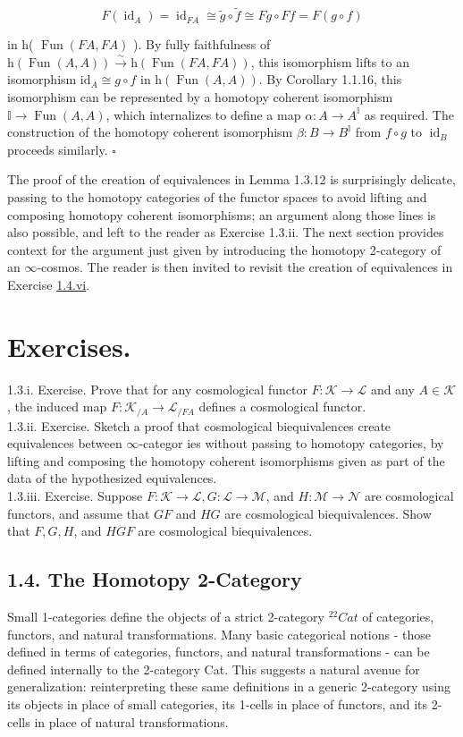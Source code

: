 \documentclass[10pt]{article}
\begin{document}
$$
F\left(\operatorname{id}_{A}\right)=\operatorname{id}_{F A} \cong \tilde{g} \circ \tilde{f} \cong F g \circ F f=F(g \circ f)
$$

in h( $\operatorname{Fun}(F A, F A)$ ). By fully faithfulness of $\mathrm{h}(\operatorname{Fun}(A, A)) \xrightarrow{\sim} \mathrm{h}(\operatorname{Fun}(F A, F A))$, this isomorphism lifts to an isomorphism $\mathrm{id}_{A} \cong g \circ f$ in $\mathrm{h}(\operatorname{Fun}(A, A))$. By Corollary 1.1.16, this isomorphism can be represented by a homotopy coherent isomorphism $\mathbb{I} \rightarrow \operatorname{Fun}(A, A)$, which internalizes to define a map $\alpha: A \rightarrow A^{\mathbb{I}}$ as required. The construction of the homotopy coherent isomorphism $\beta: B \rightarrow B^{\mathbb{I}}$ from $f \circ g$ to $\operatorname{id}_{B}$ proceeds similarly. \(\square\)

The proof of the creation of equivalences in Lemma 1.3.12 is surprisingly delicate, passing to the homotopy categories of the functor spaces to avoid lifting and composing homotopy coherent isomorphisms; an argument along those lines is also possible, and left to the reader as Exercise 1.3.ii. The next section provides context for the argument just given by introducing the homotopy 2-category of an $\infty$-cosmos. The reader is then invited to revisit the creation of equivalences in Exercise \href{http://1.4.vi}{1.4.vi}.

\section*{Exercises.}
1.3.i. Exercise. Prove that for any cosmological functor $F: \mathcal{K} \rightarrow \mathcal{L}$ and any $A \in \mathcal{K}$, the induced map $F: \mathcal{K}_{/ A} \rightarrow \mathcal{L}_{/ F A}$ defines a cosmological functor.\\
1.3.ii. Exercise. Sketch a proof that cosmological biequivalences create equivalences between $\infty$-categor ies without passing to homotopy categories, by lifting and composing the homotopy coherent isomorphisms given as part of the data of the hypothesized equivalences.\\
1.3.iii. Exercise. Suppose $F: \mathcal{K} \rightarrow \mathcal{L}, G: \mathcal{L} \rightarrow \mathcal{M}$, and $H: \mathcal{M} \rightarrow \mathcal{N}$ are cosmological functors, and assume that $G F$ and $H G$ are cosmological biequivalences. Show that $F, G, H$, and $H G F$ are cosmological biequivalences.

\subsection*{1.4. The Homotopy 2-Category}
Small 1-categories define the objects of a strict 2-category ${ }^{22} C a t$ of categories, functors, and natural transformations. Many basic categorical notions - those defined in terms of categories, functors, and natural transformations - can be defined internally to the 2-category Cat. This suggests a natural avenue for generalization: reinterpreting these same definitions in a generic 2-category using its objects in place of small categories, its 1-cells in place of functors, and its 2-cells in place of natural transformations.
\end{document}
